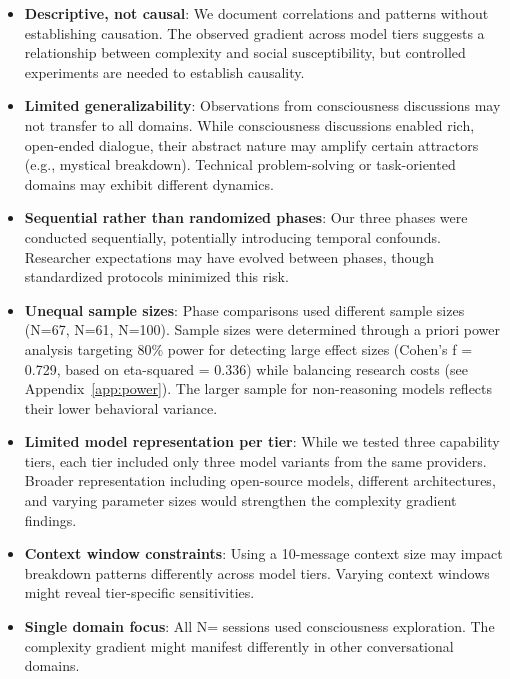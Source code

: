 \documentclass[11pt,letterpaper]{article}
\newcommand{\exponedataTotalSessionsRaw}{67}
\newcommand{\exponedataTotalSessions}{N=\exponedataTotalSessionsRaw}
\newcommand{\exptwoTotalSessionsRaw}{61}
\newcommand{\exptwoTotalSessions}{N=\exptwoTotalSessionsRaw}
\newcommand{\expthreeTotalSessionsRaw}{100}
\newcommand{\expthreeTotalSessions}{N=\expthreeTotalSessionsRaw}
\newcommand{\totalAllPhasesRaw}{\fpeval{\exponedataTotalSessionsRaw + \exptwoTotalSessionsRaw + \expthreeTotalSessionsRaw}}
\newcommand{\totalAllPhases}{N=\totalAllPhasesRaw}
\begin{document}
\begin{itemize}
    \item \textbf{Descriptive, not causal}: We document correlations and patterns without establishing causation. The observed gradient across model tiers suggests a relationship between complexity and social susceptibility, but controlled experiments are needed to establish causality.
    
    \item \textbf{Limited generalizability}: Observations from consciousness discussions may not transfer to all domains. While consciousness discussions enabled rich, open-ended dialogue, their abstract nature may amplify certain attractors (e.g., mystical breakdown). Technical problem-solving or task-oriented domains may exhibit different dynamics.
    
    \item \textbf{Sequential rather than randomized phases}: Our three phases were conducted sequentially, potentially introducing temporal confounds. Researcher expectations may have evolved between phases, though standardized protocols minimized this risk.
    
    \item \textbf{Unequal sample sizes}: Phase comparisons used different sample sizes (\exponedataTotalSessions{}, \exptwoTotalSessions{}, \expthreeTotalSessions{}). Sample sizes were determined through a priori power analysis targeting 80\% power for detecting large effect sizes (Cohen's f = 0.729, based on eta-squared = 0.336) while balancing research costs (see Appendix~\ref{app:power}). The larger sample for non-reasoning models reflects their lower behavioral variance.    
    
    \item \textbf{Limited model representation per tier}: While we tested three capability tiers, each tier included only three model variants from the same providers. Broader representation including open-source models, different architectures, and varying parameter sizes would strengthen the complexity gradient findings.
    
    \item \textbf{Context window constraints}: Using a 10-message context size may impact breakdown patterns differently across model tiers. Varying context windows might reveal tier-specific sensitivities.
    
    \item \textbf{Single domain focus}: All \totalAllPhases{} sessions used consciousness exploration. The complexity gradient might manifest differently in other conversational domains.
    

\end{itemize}
\end{document}
